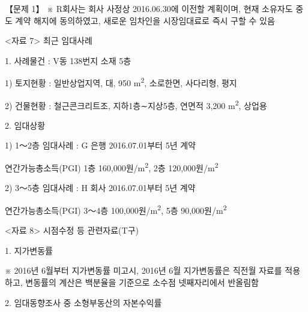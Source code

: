 \begin{longquestion}{【문제 1】}
※ R회사는 회사 사정상 2016.06.30에 이전할 계획이며, 현재 소유자도 중도 계약 해지에 동의하였고, 새로운 임차인을 시장임대료로 즉시 구할 수 있음 \par
<자료 7> 최근 임대사례 \par
1. 사례물건 : V동 138번지 소재 5층 \par
1) 토지현황 : 일반상업지역, 대, 950 m\textsuperscript{2}, 소로한면, 사다리형, 평지 \par
2) 건물현황 : 철근콘크리트조, 지하1층∼지상5층, 연면적 3,200 m\textsuperscript{2}, 상업용 \par
2. 임대상황 \par
1) 1～2층 임대사례 : G 은행 2016.07.01부터 5년 계약 \par
연간가능총소득(PGI) 1층 160,000원/m\textsuperscript{2}, 2층 120,000원/m\textsuperscript{2} \par
2) 3～5층 임대사례 : H 회사 2016.07.01부터 5년 계약 \par
연간가능총소득(PGI) 3～4층 100,000원/m\textsuperscript{2}, 5층 90,000원/m\textsuperscript{2} \par
<자료 8> 시점수정 등 관련자료(T구) \par
1. 지가변동률 \par
{\small\centering
{}\par}

※ 2016년 6월부터 지가변동률 미고시, 2016년 6월 지가변동률은 직전월 자료를 적용하고, 변동률의 계산은 백분율을 기준으로 소수점 넷째자리에서 반올림함 \par
2. 임대동향조사 중 소형부동산의 자본수익률 \par
{\small\centering
{}\par}


\end{longquestion}
